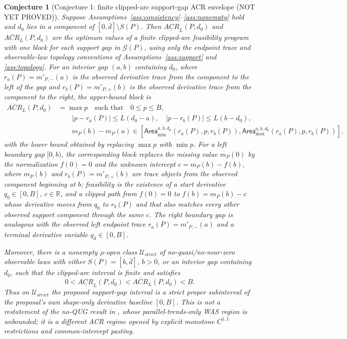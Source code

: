 \documentclass[11pt]{article}
\newcommand{\R}{\mathbb{R}}
\theoremstyle{definition}
\theoremstyle{plain}
\newtheorem{conjecture}{Conjecture}
\theoremstyle{remark}
\begin{document}
\begin{conjecture}[Conjecture 1: finite clipped-arc support-gap ACR envelope (NOT YET PROVED)]\label{conj:closed-form-gap}
Suppose Assumptions~\ref{ass:consistency}--\ref{ass:nonempty} hold and \(d_0\) lies in a component of \([0,\bar d]\setminus S(P)\).  Then \(\underline{ACR}_L(P,d_0)\) and \(\overline{ACR}_L(P,d_0)\) are the optimum values of a finite clipped-arc feasibility program with one block for each support gap in \(\mathcal{G}(P)\), using only the endpoint trace and observable-law topology conventions of Assumptions~\ref{ass:support} and \ref{ass:topology}.  For an interior gap \((a,b)\) containing \(d_0\), where \(r_a(P)=m'_{P,-}(a)\) is the observed derivative trace from the component to the left of the gap and \(r_b(P)=m'_{P,+}(b)\) is the observed derivative trace from the component to the right, the upper-bound block is
\[
\begin{aligned}
\overline{ACR}_L(P,d_0)
&=\max p
\quad\text{such that}\quad
0\le p\le B,\\
&\qquad |p-r_a(P)|\le L(d_0-a),\quad |p-r_b(P)|\le L(b-d_0),\\
&\qquad m_P(b)-m_P(a)\in
  \left[\mathsf{Area}_{\min}^{a,b,d_0}(r_a(P),p,r_b(P)),
        \mathsf{Area}_{\max}^{a,b,d_0}(r_a(P),p,r_b(P))\right],
\end{aligned}
\]
with the lower bound obtained by replacing \(\max p\) with \(\min p\).  For a left boundary gap \([0,b)\), the corresponding block replaces the missing value \(m_P(0)\) by the normalization \(f(0)=0\) and the unknown intercept \(c=m_P(b)-f(b)\), where \(m_P(b)\) and \(r_b(P)=m'_{P,+}(b)\) are trace objects from the observed component beginning at \(b\); feasibility is the existence of a start derivative \(q_0\in[0,B]\), \(c\in\R\), and a clipped path from \(f(0)=0\) to \(f(b)=m_P(b)-c\) whose derivative moves from \(q_0\) to \(r_b(P)\) and that also matches every other observed support component through the same \(c\).  The right boundary gap is analogous with the observed left endpoint trace \(r_a(P)=m'_{P,-}(a)\) and a terminal derivative variable \(q_{\bar d}\in[0,B]\).

Moreover, there is a nonempty \(\rho\)-open class \(\mathcal{U}_{strict}\) of no-quasi/no-near-zero observable laws with either \(S(P)=[b,\bar d]\), \(b>0\), or an interior gap containing \(d_0\), such that the clipped-arc interval is finite and satisfies
\[
  0<\underline{ACR}_L(P,d_0)<\overline{ACR}_L(P,d_0)<B.
\]
Thus on \(\mathcal{U}_{strict}\) the proposed support-gap interval is a strict proper subinterval of the proposal's own shape-only derivative baseline \([0,B]\).  This is not a restatement of the no-QUG result in \citet{DCDHK2026NoUntreated}, whose parallel-trends-only WAS region is unbounded; it is a different ACR regime opened by explicit monotone \(C^{1,1}\) restrictions and common-intercept pasting.
\end{conjecture}
\end{document}
